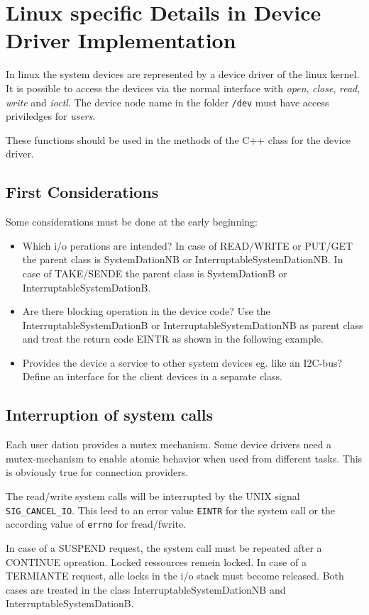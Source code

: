 \section{Linux specific Details in Device Driver Implementation}
In linux the system devices are represented by a device driver of
the linux kernel.
It is possible to access the devices via the normal interface
with {\em open}, {\em close}, {\em read}, {\em write} and {\em ioctl}.
The device node name in the folder \verb|/dev| must have access
priviledges for {\em users}.

These functions should be used in the methods of the C++ class 
for the device driver.

\subsection{First Considerations}
Some considerations must be done at the early beginning:
\begin{itemize}
\item Which i/o perations are intended?\newline
In case of  READ/WRITE or PUT/GET the parent class is SystemDationNB or 
InterruptableSystemDationNB.
In case of  TAKE/SENDE the parent class is SystemDationB or 
InterruptableSystemDationB.
\item Are there blocking operation in the device code?
\newline
Use the InterruptableSystemDationB or InterruptableSystemDationNB as parent
class and treat the return code EINTR as shown in the following example.
\item Provides the device a service to other system devices eg. like
an I2C-bus?
Define an interface for the client devices in a separate class.
\end{itemize}

\subsection{Interruption of system calls}
Each user dation provides a mutex mechanism. 
Some device drivers need a mutex-mechanism to enable atomic behavior
when used from different tasks.
This is obviously true for connection providers.

The read/write system calls will be interrupted by the UNIX signal
\verb|SIG_CANCEL_IO|. This leed to an error value \texttt{EINTR} for
the system call or the according value of \texttt{errno} for fread/fwrite.

In case of a SUSPEND request, the system call must be repeated after a 
CONTINUE opreation. Locked ressources remein locked.
In case of a TERMIANTE request, alle locks in the i/o stack must become
released. 
Both cases are treated in the class InterruptableSystemDationNB and 
InterruptableSystemDationB.


